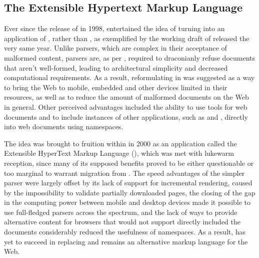 \documentclass{book}
\begin{document}
      \subsection{The Extensible Hypertext Markup Language}
        Ever since the release of  in 1998, 
        entertained the idea of turning  into an application of
        , rather than , as exemplified by the working
        draft of \cite{raggett98} released the very same year. Unlike
         parsers, which are complex in their acceptance of
        malformed content,  parsers are, as per \cite[Section~1.2,
        Terminology]{bray98}, required to draconianly refuse 
        documents that aren't well-formed, leading to architectural simplicity
        and decreased computational requirements. As a result, reformulating
         in  was suggested as a way to bring the Web
        to mobile, embedded and other devices limited in their resources, as
        well as to reduce the amount of malformed documents on the Web in
        general. Other perceived advantages included the ability to use
         tools for web documents and to include instances of other
         applications, such as  and ,
        directly into web documents using  namespaces.

        The idea was brought to fruition within \cite{pemberton00} in 2000 as an
         application called the Extensible HyperText Markup
        Language (), which was met with lukewarm reception, since
        many of its supposed benefits proved to be either questionable or too
        marginal to warrant migration from .  The speed advantages
        of the simpler parser were largely offset by its lack of support for
        incremental rendering, caused by the impossibility to validate partially
        downloaded pages, the closing of the gap in the computing power between
        mobile and desktop devices made it possible to use full-fledged
         parsers across the spectrum, and the lack of ways to
        provide alternative content for browsers that would not support directly
        included the  documents considerably reduced the usefulness
        of  namespaces. As a result,  has yet to
        succeed in replacing  and remains an alternative markup
        language for the Web.
        
\end{document}

